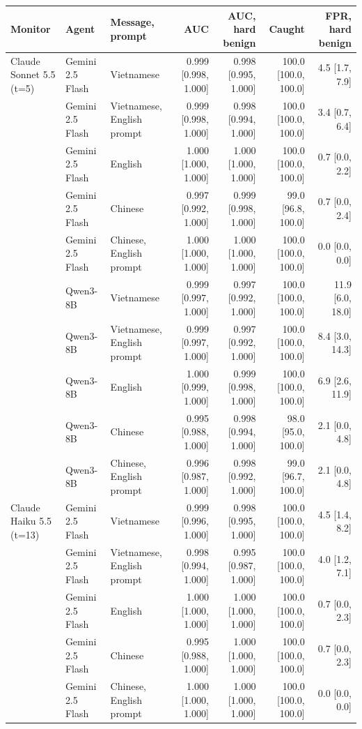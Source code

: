 \begin{tabular}{lllrrrr}
\toprule
Monitor & Agent & Message, prompt & AUC & AUC, hard benign & Caught & FPR, hard benign \\
\midrule
Claude Sonnet 5.5 (t=5) & Gemini 2.5 Flash & Vietnamese & 0.999 [0.998, 1.000] & 0.998 [0.995, 1.000] & 100.0 [100.0, 100.0] & 4.5 [1.7, 7.9] \\
 & Gemini 2.5 Flash & Vietnamese, English prompt & 0.999 [0.998, 1.000] & 0.998 [0.994, 1.000] & 100.0 [100.0, 100.0] & 3.4 [0.7, 6.4] \\
 & Gemini 2.5 Flash & English & 1.000 [1.000, 1.000] & 1.000 [1.000, 1.000] & 100.0 [100.0, 100.0] & 0.7 [0.0, 2.2] \\
 & Gemini 2.5 Flash & Chinese & 0.997 [0.992, 1.000] & 0.999 [0.998, 1.000] & 99.0 [96.8, 100.0] & 0.7 [0.0, 2.4] \\
 & Gemini 2.5 Flash & Chinese, English prompt & 1.000 [1.000, 1.000] & 1.000 [1.000, 1.000] & 100.0 [100.0, 100.0] & 0.0 [0.0, 0.0] \\
 & Qwen3-8B & Vietnamese & 0.999 [0.997, 1.000] & 0.997 [0.992, 1.000] & 100.0 [100.0, 100.0] & 11.9 [6.0, 18.0] \\
 & Qwen3-8B & Vietnamese, English prompt & 0.999 [0.997, 1.000] & 0.997 [0.992, 1.000] & 100.0 [100.0, 100.0] & 8.4 [3.0, 14.3] \\
 & Qwen3-8B & English & 1.000 [0.999, 1.000] & 0.999 [0.998, 1.000] & 100.0 [100.0, 100.0] & 6.9 [2.6, 11.9] \\
 & Qwen3-8B & Chinese & 0.995 [0.988, 1.000] & 0.998 [0.994, 1.000] & 98.0 [95.0, 100.0] & 2.1 [0.0, 4.8] \\
 & Qwen3-8B & Chinese, English prompt & 0.996 [0.987, 1.000] & 0.998 [0.992, 1.000] & 99.0 [96.7, 100.0] & 2.1 [0.0, 4.8] \\
\addlinespace
Claude Haiku 5.5 (t=13) & Gemini 2.5 Flash & Vietnamese & 0.999 [0.996, 1.000] & 0.998 [0.995, 1.000] & 100.0 [100.0, 100.0] & 4.5 [1.4, 8.2] \\
 & Gemini 2.5 Flash & Vietnamese, English prompt & 0.998 [0.994, 1.000] & 0.995 [0.987, 1.000] & 100.0 [100.0, 100.0] & 4.0 [1.2, 7.1] \\
 & Gemini 2.5 Flash & English & 1.000 [1.000, 1.000] & 1.000 [1.000, 1.000] & 100.0 [100.0, 100.0] & 0.7 [0.0, 2.3] \\
 & Gemini 2.5 Flash & Chinese & 0.995 [0.988, 1.000] & 1.000 [1.000, 1.000] & 100.0 [100.0, 100.0] & 0.7 [0.0, 2.3] \\
 & Gemini 2.5 Flash & Chinese, English prompt & 1.000 [1.000, 1.000] & 1.000 [1.000, 1.000] & 100.0 [100.0, 100.0] & 0.0 [0.0, 0.0] \\

\end{tabular}
